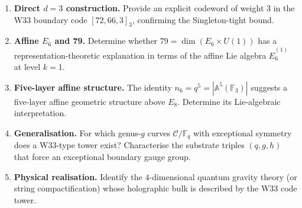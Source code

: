 \documentclass[12pt]{article}
\newcommand{\F}{\mathbb{F}}
\begin{document}
\begin{enumerate}
 \item \textbf{Direct $d=3$ construction.}
 Provide an explicit codeword of weight $3$ in the W33 boundary code $[72,66,3]_3$,
 confirming the Singleton-tight bound.

 \item \textbf{Affine $E_6$ and 79.}
 Determine whether $79 = \dim(E_6 \times U(1))$ has a representation-theoretic
 explanation in terms of the affine Lie algebra $\hat{E}_6^{(1)}$ at level $k=1$.

 \item \textbf{Five-layer affine structure.}
 The identity $n_6 = q^5 = |\mathbb{A}^5(\F_3)|$ suggests a five-layer
 affine geometric structure above $E_8$. Determine its Lie-algebraic interpretation.

 \item \textbf{Generalisation.}
 For which genus-$g$ curves $\mathcal{C}/\F_q$ with exceptional symmetry
 does a W33-type tower exist? Characterise the substrate triples $(q,g,h)$
 that force an exceptional boundary gauge group.

 \item \textbf{Physical realisation.}
 Identify the $4$-dimensional quantum gravity theory (or string compactification)
 whose holographic bulk is described by the W33 code tower.
\end{enumerate}

\end{document}
